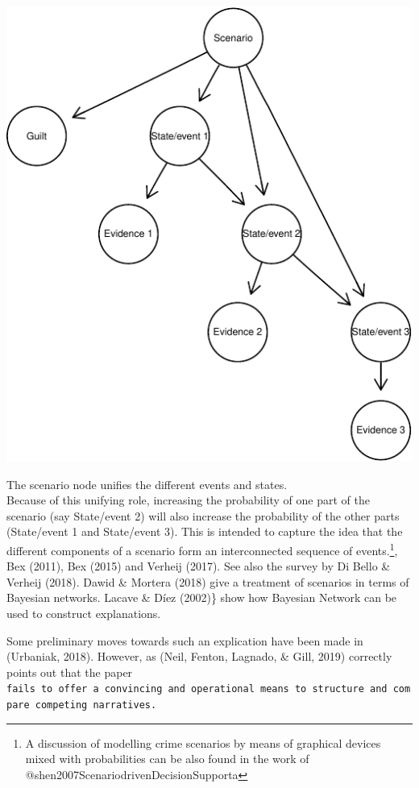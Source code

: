 \documentclass[11pt,dvipsnames,enabledeprecatedfontcommands]{scrartcl}
\begin{document}
\begin{center}\includegraphics{BNfiles/unnamed-chunk-13-1} \end{center}

\noindent
 The scenario node unifies the different events and states.\\
Because of this unifying role, increasing the probability of one part of
the scenario (say \textsf{State/event 2}) will also increase the
probability of the other parts (\textsf{State/event 1} and
\textsf{State/event 3}). This is intended to capture the idea that the
different components of a scenario form an interconnected sequence of
events.\footnote{A discussion
of modelling crime scenarios by means of  graphical devices mixed with probabilities can be also found in the work of @shen2007ScenariodrivenDecisionSupporta},
Bex (2011), Bex (2015) and Verheij (2017). See also the survey by Di
Bello \& Verheij (2018). Dawid \& Mortera (2018) give a treatment of
scenarios in terms of Bayesian networks. Lacave \& Díez (2002)\} show
how Bayesian Network can be used to construct explanations.

Some preliminary moves towards such an explication have been made in
(Urbaniak, 2018). However, as (Neil, Fenton, Lagnado, \& Gill, 2019)
correctly points out that the paper
\texttt{fails\ to\ offer\ a\ convincing\ and\ operational\ means\ to\ structure\ and\ compare\ competing\ narratives.}
\end{document}
